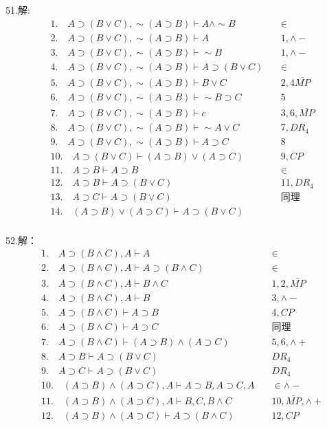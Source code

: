 \documentclass[a4paper]{ctexart}
\begin{document}
\noindent 51.解:
\begin{align*}
  &1. \quad A\supset(B\vee C),\sim(A\supset B)\vdash A\wedge\sim B \quad&\in \\
  &2. \quad A\supset(B\vee C),\sim(A\supset B)\vdash A \quad&1,\wedge-  \\
  &3. \quad A\supset(B\vee C),\sim(A\supset B)\vdash \sim B \quad&1,\wedge- \\
  &4. \quad A\supset(B\vee C),\sim(A\supset B)\vdash A\supset(B\vee C) \quad&\in \\
  &5. \quad A\supset(B\vee C),\sim(A\supset B)\vdash B\vee C \quad& 2,4\bar{MP}\\
  &6. \quad A\supset(B\vee C),\sim(A\supset B)\vdash \sim B\supset C  \quad&5 \\
  &7. \quad A\supset(B\vee C),\sim(A\supset B)\vdash c\quad&3,6,\bar{MP} \\
  &8. \quad A\supset(B\vee C),\sim(A\supset B)\vdash \sim A\vee C \quad&7,DR_4 \\
  &9. \quad  A\supset(B\vee C),\sim(A\supset B)\vdash A\supset C \quad& 8\\
  &10. \quad A\supset(B\vee C)\vdash (A\supset B)\vee(A\supset C)\quad&9,CP \\
  &11. \quad A\supset B\vdash A\supset B\quad& \in\\
  &12. \quad A\supset B\vdash A\supset(B\vee C) \quad&11,DR_4 \\
  &13. \quad A\supset C\vdash A\supset(B\vee C) \quad&\text{同理} \\
  &14. \quad (A\supset B)\vee(A\supset C)\vdash A\supset(B\vee C) \quad& \\
\end{align*}

\noindent 52.解：
\begin{align*}
  &1. \quad A\supset(B\wedge C),A \vdash A &\quad\in \\
  &2. \quad A\supset(B\wedge C),A \vdash A\supset(B\wedge C) &\quad\in \\
  &3. \quad A\supset(B\wedge C),A \vdash B\wedge C&\quad 1,2,\bar{MP} \\
  &4. \quad A\supset(B\wedge C),A \vdash B &\quad 3,\wedge-\\
  &5. \quad A\supset(B\wedge C) \vdash A\supset B &\quad 4,CP \\
  &6. \quad A\supset(B\wedge C) \vdash A\supset C &\quad \text{同理} \\
  &7. \quad A\supset(B\wedge C) \vdash (A\supset B)\wedge(A\supset C) &\quad 5,6,\wedge+ \\
  &8. \quad A\supset B \vdash A\supset(B\vee C) &\quad DR_4 \\
  &9. \quad A\supset C \vdash A\supset(B\vee C) &\quad DR_4 \\
  &10. \quad (A\supset B)\wedge(A\supset C),A\vdash A\supset B,A\supset C, A &\quad \in \wedge- \\
  &11. \quad (A\supset B)\wedge(A\supset C),A\vdash B,C,B\wedge C &\quad 10,\bar{MP},\wedge+ \\
  &12. \quad (A\supset B)\wedge(A\supset C) \vdash A\supset(B\wedge C) &\quad 12,CP \\
\end{align*}
\end{document}
